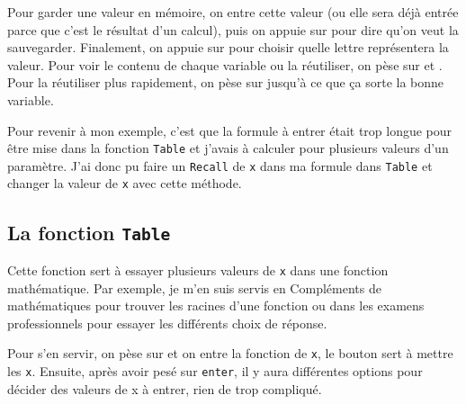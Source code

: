 \documentclass[french]{article}
\begin{document}
Pour garder une valeur en mémoire, on entre cette valeur (ou elle sera déjà entrée parce que c'est le résultat d'un calcul), puis on appuie sur  pour dire qu'on veut la sauvegarder. Finalement, on appuie sur  pour choisir quelle lettre représentera la valeur. Pour voir le contenu de chaque variable ou la réutiliser, on pèse sur  et . Pour la réutiliser plus rapidement, on pèse sur  jusqu'à ce que ça sorte la bonne variable.

Pour revenir à mon exemple, c'est que la formule à entrer était trop longue pour être mise dans la fonction \texttt{Table} et j'avais à calculer pour plusieurs valeurs d'un paramètre. J'ai donc pu faire un \texttt{Recall} de \texttt{x} dans ma formule dans \texttt{Table} et changer la valeur de \texttt{x} avec cette méthode.

\subsection{La fonction \texttt{Table}}
Cette fonction sert à essayer plusieurs valeurs de \texttt{x} dans une fonction mathématique. Par exemple, je m'en suis servis en Compléments de mathématiques pour trouver les racines d'une fonction ou dans les examens professionnels pour essayer les différents choix de réponse. 

Pour s'en servir, on pèse sur  et on entre la fonction de \texttt{x}, le bouton  sert à mettre les \texttt{x}. Ensuite, après avoir pesé sur \texttt{enter}, il y aura différentes options pour décider des valeurs de x à entrer, rien de trop compliqué.
\end{document}
